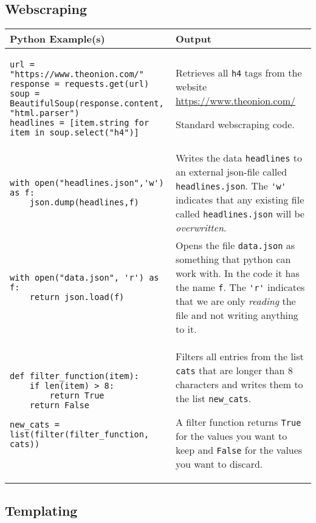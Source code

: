 \documentclass[11pt,a4paper]{report}
\begin{document}
\newpage
\subsection{Webscraping}

\begin{longtable}{|p{}|p{}|}
\hline
Python  Example(s) & Output  \\
\hline 
\endhead
 \begin{lstlisting}
url = "https://www.theonion.com/"
response = requests.get(url)
soup = BeautifulSoup(response.content, "html.parser")
headlines = [item.string for item in soup.select("h4")]
\end{lstlisting}  & Retrieves all \verb|h4| tags from the website \url{https://www.theonion.com/}

Standard webscraping code. \\
\hline
\begin{lstlisting}
with open("headlines.json",'w') as f:
    json.dump(headlines,f)
\end{lstlisting} &
Writes the data \verb|headlines| to an external json-file called \verb|headlines.json|. The \verb|'w'| indicates that any existing file called \verb|headlines.json| will be \emph{overwritten}.\\
\hline
\begin{lstlisting}
with open("data.json", 'r') as f:
    return json.load(f)
\end{lstlisting} &
Opens the file \verb|data.json| as something that python can work with. In the code it has the name \verb|f|. The \verb|'r'| indicates that we are only \emph{reading} the file and not writing anything to it. \\
\hline
\begin{lstlisting}
def filter_function(item):
    if len(item) > 8:
        return True
    return False

new_cats = list(filter(filter_function, cats))
\end{lstlisting} &
Filters all entries from the list \verb|cats| that are longer than $8$ characters and writes  them to the list \verb|new_cats|.

A filter function returns \verb|True| for the values you want to keep and \verb|False| for the values you want to discard. \\
\hline

\end{longtable}

\newpage
\subsection{Templating}
\end{document}
